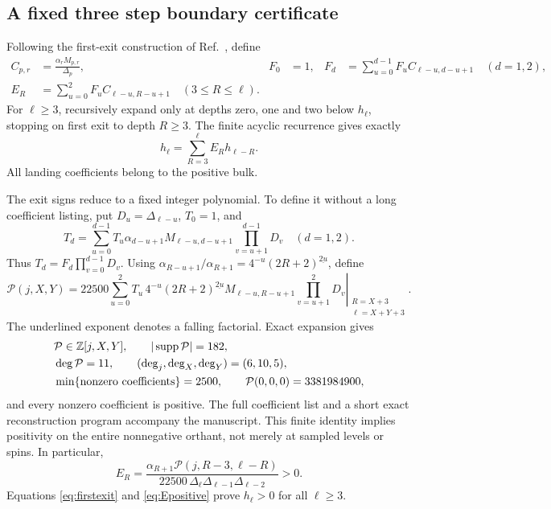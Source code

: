 \documentclass[11pt,a4paper]{article}
\theoremstyle{remark}\newtheorem{remark}[theorem]{Remark}
\begin{document}
\subsection{A fixed three step boundary certificate}
Following the first-exit construction of Ref.~\cite{Chen}, define
\begin{align}
 C_{p,r}&=\frac{\alpha_rM_{p,r}}{\Delta_p},&
 F_0&=1,&
 F_d&=\sum_{u=0}^{d-1}F_uC_{\ell-u,d-u+1}\quad(d=1,2),\\
 E_R&=\sum_{u=0}^{2}F_uC_{\ell-u,R-u+1}
 \quad(3\leq R\leq\ell).
\end{align}
For $\ell\geq3$, recursively expand only at depths zero, one and two below $h_\ell$, stopping on first exit to depth $R\geq3$. The finite acyclic recurrence gives exactly
\begin{equation}\label{eq:firstexit}
 h_\ell=\sum_{R=3}^{\ell}E_Rh_{\ell-R}.
\end{equation}
All landing coefficients belong to the positive bulk.

The exit signs reduce to a fixed integer polynomial. To define it without a long coefficient listing, put $D_u=\Delta_{\ell-u}$, $T_0=1$, and
\begin{equation}
 T_d=\sum_{u=0}^{d-1}T_u\alpha_{d-u+1}M_{\ell-u,d-u+1}
       \prod_{v=u+1}^{d-1}D_v\quad(d=1,2).
\end{equation}
Thus $T_d=F_d\prod_{v=0}^{d-1}D_v$. Using
$\alpha_{R-u+1}/\alpha_{R+1}=4^{-u}(2R+2)^{\underline{2u}}$, define
\begin{equation}\label{eq:Pconstruction}
 \mathcal P(j,X,Y)=
 \left.
 22500\sum_{u=0}^{2}
 T_u\,4^{-u}(2R+2)^{\underline{2u}}
 M_{\ell-u,R-u+1}\prod_{v=u+1}^{2}D_v
 \right|_{\substack{R=X+3\\\ell=X+Y+3}} .
\end{equation}
The underlined exponent denotes a falling factorial. Exact expansion gives
\begin{align}\label{eq:Pcertificate}
 &\mathcal P\in\mathbb Z[j,X,Y],\qquad
 |\operatorname{supp}\mathcal P|=182,\notag\\
 &\deg\mathcal P=11,\qquad
 (\deg_j,\deg_X,\deg_Y)=(6,10,5),\notag\\
 &\min\{\text{nonzero coefficients}\}=2500,\qquad
 \mathcal P(0,0,0)=3381984900,
\end{align}
and every nonzero coefficient is positive. The full coefficient list and a short exact reconstruction program accompany the manuscript. This finite identity implies positivity on the entire nonnegative orthant, not merely at sampled levels or spins. In particular,
\begin{equation}\label{eq:Epositive}
 E_R=\frac{\alpha_{R+1}\mathcal P(j,R-3,\ell-R)}
 {22500\,\Delta_\ell\Delta_{\ell-1}\Delta_{\ell-2}}>0.
\end{equation}
Equations \eqref{eq:firstexit} and \eqref{eq:Epositive} prove $h_\ell>0$ for all $\ell\geq3$.
\end{document}
